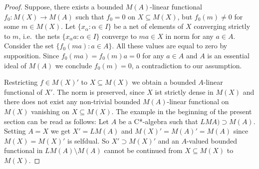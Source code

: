 \documentclass[10pt,a4paper]{amsart}
\begin{document}
\begin{proof}
Suppose, there exists a bounded $M(A)$-linear functional $f_0 : M(X) \to M(A)$ such that $f_0=0$ on $X \subseteq M(X)$, but $f_0(m) \neq 0$ for some $m \in M(X)$. Let $\{ x_\alpha: \alpha \in I\}$ be a net of elements of $X$ converging strictly to $m$, i.e.~the nets $\{ x_\alpha a: \alpha \in I\}$ converge to $ma \in X$ in norm for any $a \in A$. Consider the set $\{ f_0(ma) : a \in A \}$. All these values are equal to zero by supposition. Since  $f_0(ma) = f_0(m) a = 0$ for any $a \in A$ and $A$ is an essential ideal of $M(A)$ we conclude $f_0(m) =0$, a contradiction to our assumption.

Restricting $f \in M(X)'$ to $X \subseteq M(X)$ we obtain a bounded $A$-linear functional of $X'$. The norm is preserved, since $X$ ist strictly dense in $M(X)$ and there does not exist any non-trivial bounded $M(A)$-linear functional on $M(X)$ vanishing on $X \subseteq M(X)$. The example in the beginning of the present section can be read as follows: Let $A$ be a C*-algebra such that $LMA) \supset M(A)$. Setting $A=X$ we get $X'=LM(A)$ and $M(X)'=M(A)'= M(A)$ since $M(X)=M(X)'$ is selfdual. So $X' \supset M(X)'$ and an $A$-valued bounded functional in $LM(A) \setminus M(A)$ cannot be continued from $X \subseteq M(X)$ to $M(X)$.
\end{proof}
\end{document}
